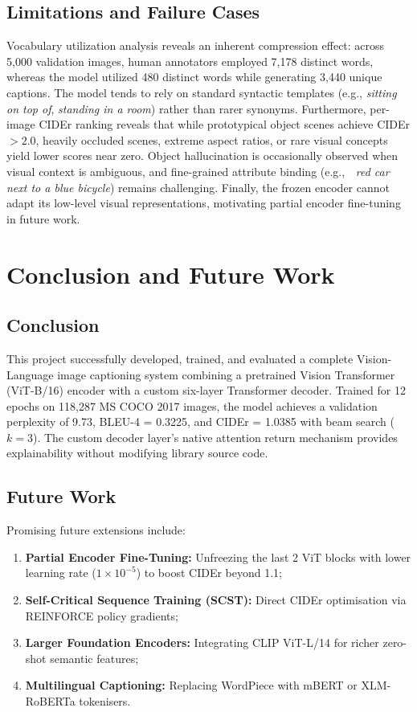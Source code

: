 \documentclass[conference]{IEEEtran}
\begin{document}
\subsection{Limitations and Failure Cases}
Vocabulary utilization analysis reveals an inherent compression effect: across 5,000 validation images, human annotators employed 7,178 distinct words, whereas the model utilized 480 distinct words while generating 3,440 unique captions. The model tends to rely on standard syntactic templates (e.g., \textit{sitting on top of}, \textit{standing in a room}) rather than rarer synonyms. Furthermore, per-image CIDEr ranking reveals that while prototypical object scenes achieve CIDEr $> 2.0$, heavily occluded scenes, extreme aspect ratios, or rare visual concepts yield lower scores near zero. Object hallucination is occasionally observed when visual context is ambiguous, and fine-grained attribute binding (e.g., \textit{ red car next to a blue bicycle}) remains challenging. Finally, the frozen encoder cannot adapt its low-level visual representations, motivating partial encoder fine-tuning in future work.

\section{Conclusion and Future Work}

\subsection{Conclusion}
This project successfully developed, trained, and evaluated a complete Vision-Language image captioning system combining a pretrained Vision Transformer (ViT-B/16) encoder with a custom six-layer Transformer decoder. Trained for 12 epochs on 118,287 MS COCO 2017 images, the model achieves a validation perplexity of 9.73, BLEU-4 = 0.3225, and CIDEr = 1.0385 with beam search ($k=3$). The custom decoder layer's native attention return mechanism provides explainability without modifying library source code.

\subsection{Future Work}
Promising future extensions include:
\begin{enumerate}
    \item \textbf{Partial Encoder Fine-Tuning:} Unfreezing the last 2 ViT blocks with lower learning rate ($1 \times 10^{-5}$) to boost CIDEr beyond 1.1;
    \item \textbf{Self-Critical Sequence Training (SCST):} Direct CIDEr optimisation via REINFORCE policy gradients;
    \item \textbf{Larger Foundation Encoders:} Integrating CLIP ViT-L/14 for richer zero-shot semantic features;
    \item \textbf{Multilingual Captioning:} Replacing WordPiece with mBERT or XLM-RoBERTa tokenisers.
\end{enumerate}
\end{document}
